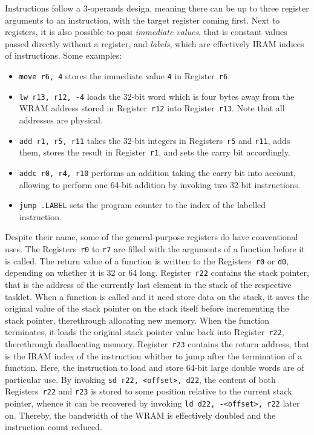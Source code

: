 Instructions follow a 3-operands design, meaning there can be up to three register arguments to an instruction, with the target register coming first.
Next to registers, it is also possible to pass \emph{immediate values}, that is constant values passed directly without a register, and \emph{labels}, which are effectively \ac{IRAM} indices of instructions.
Some examples:
\begin{itemize}
	\item
	\lstinline|move r6, 4| stores the immediate value \lstinline|4| in Register~\lstinline|r6|.

	\item
	\lstinline|lw r13, r12, -4| loads the 32-bit word which is four bytes away from the \ac{WRAM} address stored in Register~\lstinline|r12| into Register~\lstinline|r13|.
	Note that all addresses are physical.

	\item
	\lstinline|add r1, r5, r11| takes the 32-bit integers in Registers~\lstinline|r5| and \lstinline|r11|, adds them, stores the result in Register~\lstinline|r1|, and sets the carry bit accordingly.

	\item
	\lstinline|addc r0, r4, r10| performs an addition taking the carry bit into account, allowing to perform one 64-bit addition by invoking two 32-bit instructions.

	\item
	\lstinline|jump .LABEL| sets the program counter to the index of the labelled instruction.
\end{itemize}
Despite their name, some of the general-purpose registers do have conventional uses.
The Registers~\lstinline|r0| to \lstinline|r7| are filled with the arguments of a function before it is called.
The return value of a function is written to the Registers~\lstinline|r0| or \lstinline|d0|, depending on whether it is \qty{32}{\bits} or \qty{64}{\bits} long.
Register~\lstinline|r22| contains the stack pointer, that is the address of the currently last element in the stack of the respective tasklet.
When a function is called and it need store data on the stack, it saves the original value of the stack pointer on the stack itself before incrementing the stack pointer, therethrough allocating new memory.
When the function terminates, it loads the original stack pointer value back into Register~\lstinline|r22|, therethrough deallocating memory.
Register~\lstinline|r23| contains the return address, that is the \ac{IRAM} index of the instruction whither to jump after the termination of a function.
Here, the instruction to load and store 64-bit large double words are of particular use.
By invoking \lstinline|sd r22, <offset>, d22|, the content of both Registers~\lstinline|r22| and \lstinline|r23| is stored to some position relative to the current stack pointer, whence it can be recovered by invoking \lstinline|ld d22, -<offset>, r22| later on.
Thereby, the bandwidth of the \ac{WRAM} is effectively doubled and the instruction count reduced.

